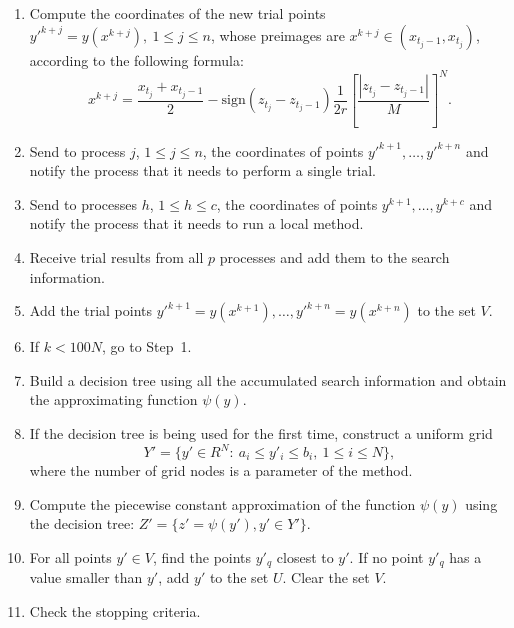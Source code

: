 \documentclass[runningheads]{llncs}
\begin{document}
\begin{enumerate}
	\item Compute the coordinates of the new trial points $y'^{k+j}=y\left(x^{k+j}\right), \ 1\leq j\leq n$, whose preimages are  $x^{k+j}\in\left(x_{t_j-1},x_{t_j}\right)$, according to the following formula:
	\begin{equation}
		\label{agp5_x1}
		x^{k+j}=\frac{x_{t_j}+x_{t_j-1}}{2}-\mathrm{sign}\left(z_{t_j}-z_{t_j-1}\right)\frac{1}{2r}\left[\frac{\left|z_{t_j}-z_{t_j-1}\right|}{M}\right]^N.
	\end{equation}	
	

	
	\item Send to process $j$, $1 \leq j \leq n$, the coordinates of points $y'^{k+1}, \dots, y'^{k+n}$ and notify the process that it needs to perform a single trial.
	
	\item Send to processes $h$, $1 \leq h \leq c$, the coordinates of points $y^{k+1}, \dots, y^{k+c}$ and notify the process that it needs to run a local method.
	
	\item Receive trial results from all $p$ processes and add them to the search information.
	
	\item Add the trial points $y'^{k+1}=y\left(x^{k+1}\right) , \dots, y'^{k+n}=y\left(x^{k+n}\right)$  to the set $V$.
	
	\item If $k < 100N$, go to Step~1.
	
	
	\item Build a decision tree using all the accumulated search information and obtain the approximating function $\psi(y)$.
	
	\item If the decision tree is being used for the first time, construct a uniform grid
	\begin{displaymath} 
		Y'=\{ y'\in R^N:\ a_i\le y'_i \le b_i,\ 1\le i\le N \},
	\end{displaymath} 
	where the number of grid nodes is a parameter of the method.
	
	
	\item Compute the piecewise constant approximation of the function $\psi(y)$ using the decision tree: $Z' = \{ z' = \psi(y'), y' \in Y' \}$.
	
	\item For all points $y' \in V$, find the points $y'_q$ closest to $y'$.
		If no point $y'_q$ has a value smaller than $y'$, add $y'$ to the set $U$.
		Clear the set $V$.
	
	\item Check the stopping criteria.
	
\end{enumerate}
\end{document}
